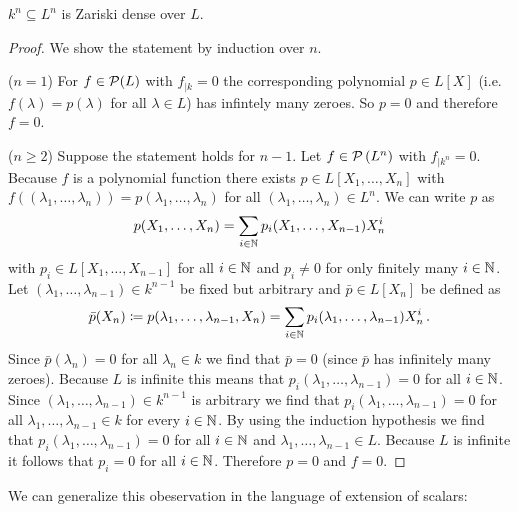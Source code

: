 \begin{lem}
  $k^n \subseteq L^n$ is Zariski dense over $L$.
\end{lem}
\begin{proof}
  We show the statement by induction over $n$.
  
  ($n = 1$)
  For $f \in \mathcal{P}(L)$ with $f_{|k} = 0$ the corresponding polynomial $p \in L[X]$ (i.e.\ $f(\lambda) = p(\lambda)$ for all $\lambda \in L$) has infintely many zeroes.
  So $p = 0$ and therefore $f = 0$.
  
  ($n \geq 2$)
  Suppose the statement holds for $n-1$.
  Let $f \in \mathcal{P}\left(L^n\right)$ with $f_{|k^n} = 0$.
  Because $f$ is a polynomial function there exists $p \in L[X_1, \dotsc, X_n]$ with $f((\lambda_1, \dotsc, \lambda_n)) = p(\lambda_1, \dotsc, \lambda_n)$ for all $(\lambda_1, \dotsc, \lambda_n) \in L^n$.
  We can write $p$ as
  \[
      p(X_1, \dotsc, X_n)
    = \sum_{i \in \mathbb{N}} p_i(X_1, \dotsc, X_{n-1}) X_n^i
  \]
  with $p_i \in L[X_1, \dotsc, X_{n-1}]$ for all $i \in \mathbb{N}$ and $p_i \neq 0$ for only finitely many $i \in \mathbb{N}$.
  Let $(\lambda_1, \dotsc, \lambda_{n-1}) \in k^{n-1}$ be fixed but arbitrary and $\bar{p} \in L[X_n]$ be defined as
  \[
              \bar{p}(X_n)
    \coloneqq p(\lambda_1, \dotsc, \lambda_{n-1}, X_n)
    =         \sum_{i \in \mathbb{N}} p_i(\lambda_1, \dotsc, \lambda_{n-1}) X_n^i \,.
  \]
  Since $\bar{p}(\lambda_n) = 0$ for all $\lambda_n \in k$ we find that $\bar{p} = 0$ (since $\bar{p}$ has infinitely many zeroes).
  Because $L$ is infinite this means that $p_i(\lambda_1, \dotsc, \lambda_{n-1}) = 0$ for all $i \in \mathbb{N}$.
  Since $(\lambda_1, \dotsc, \lambda_{n-1}) \in k^{n-1}$ is arbitrary we find that $p_i(\lambda_1, \dotsc, \lambda_{n-1}) = 0$ for all $\lambda_1, \dotsc, \lambda_{n-1} \in k$ for every $i \in \mathbb{N}$.
  By using the induction hypothesis we find that $p_i(\lambda_1, \dotsc, \lambda_{n-1}) = 0$ for all $i \in \mathbb{N}$ and $\lambda_1, \dotsc, \lambda_{n-1} \in L$.
  Because $L$ is infinite it follows that $p_i = 0$ for all $i \in \mathbb{N}$.
  Therefore $p = 0$ and $f = 0$.
\end{proof}


We can generalize this obeservation in the language of extension of scalars:


